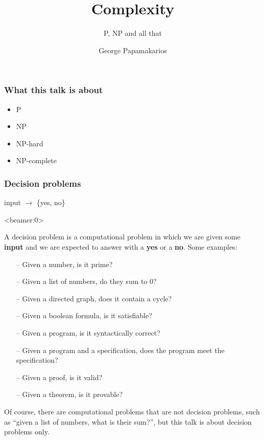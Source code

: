 \documentclass[handout, 12pt]{beamer}
\title{Complexity}
\subtitle{P, NP and all that}
\author{George Papamakarios}
\date{}
\begin{document}
\frame{\titlepage}

\begin{frame}

\frametitle{What this talk is about}

\centering
\begin{minipage}{0.3\textwidth}
\begin{itemize}
\item P
\item NP
\item NP-hard
\item NP-complete
\end{itemize}
\end{minipage}

\end{frame}

\begin{frame}

\frametitle{Decision problems}
\centering

input $\rightarrow$ \{yes, no\}

\end{frame}

\begin{frame}<beamer:0>

\footnotesize
A decision problem is a computational problem in which we are given some \textbf{input} and we are expected to answer with a \textbf{yes} or a \textbf{no}. Some examples:
\begin{itemize}
\item[--] Given a number, is it prime?
\item[--] Given a list of numbers, do they sum to $0$?
\item[--] Given a directed graph, does it contain a cycle?
\item[--] Given a boolean formula, is it satisfiable?
\item[--] Given a program, is it syntactically correct?
\item[--] Given a program and a specification, does the program meet the specification?
\item[--] Given a proof, is it valid?
\item[--] Given a theorem, is it provable?
\end{itemize}
Of course, there are computational problems that are not decision problems, such as ``given a list of numbers, what is their sum?'', but this talk is about decision problems only.

\end{frame}
\end{document}

